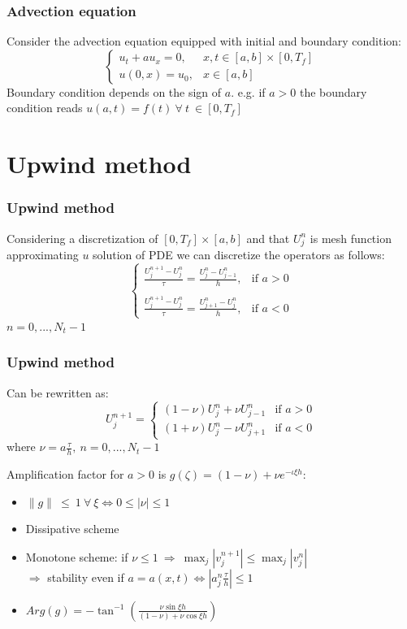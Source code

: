 \documentclass{beamer}
\begin{document}
\begin{frame}
\frametitle{Advection equation}
Consider the advection equation equipped with initial and boundary condition:
$$
\begin{cases}
u_t + a u_x = 0, & x,t \in [a,b] \times [0,T_f] \\
u(0,x) = u_0, & x \in [a,b]
\end{cases}
$$
Boundary condition depends on the sign of $a$. e.g. if $a > 0$ the boundary condition reads $u(a,t) = f(t) \ \forall \ t \ \in [0,T_f]$
\end{frame}
\section{Upwind method}
\begin{frame}
\frametitle{Upwind method}
Considering a discretization of $[0,T_f] \times [a,b]$ and that $U_j^n$ is mesh function approximating $u$ solution of PDE we can discretize the operators as follows:
\[
\begin{cases}
\displaystyle{\frac{U_j^{n+1} - U_j^n}{\tau} = \frac{U_j^n - U_{j-1}^n}{h}}, & \text{if } a > 0 \\ 
\\
\displaystyle{\frac{U_j^{n+1} - U_j^n}{\tau} = \frac{U_{j+1}^n - U_j^n}{h}}, & \text{if } a < 0
\end{cases}
\]
$n = 0, ..., N_t - 1$
\end{frame}
\begin{frame}
\frametitle{Upwind method}
Can be rewritten as:
\[
U_j^{n+1} =
\begin{cases}
(1 - \nu) U_j^n + \nu U_{j - 1}^n & \text{if } a > 0 \\
(1 + \nu) U_j^n - \nu U_{j + 1}^n & \text{if } a < 0
\end{cases}
\]
where $\nu = a \displaystyle{\frac{\tau}{h}}, \ n = 0, ..., N_t - 1$
\end{frame}
\begin{frame}
Amplification factor for $a > 0$ is $g(\zeta) = (1 - \nu) + \nu e^{-\iota \xi h}$:
\begin{itemize}
\setlength\itemsep{1em}
\item $ \|g\| \ \leq \ 1 \ \forall \ \xi \iff  0 \leq |\nu| \leq 1$
\item Dissipative scheme
\item Monotone scheme: if $\nu \leq 1 \ \Rightarrow \ \max_j{|v_j^{n+1}|} \leq \max_j{|v_j^n|}$
\\ $\Rightarrow$ stability even if $a = a(x,t) \iff |a_j^n \frac{\tau}{h}| \leq 1$
\item $Arg(g) = \displaystyle{-\tan^{-1}\left(\frac{\nu \sin{\xi h}}{(1 - \nu) + \nu \cos{\xi h}}\right)}$
\end{itemize}
\end{frame}
\end{document}
